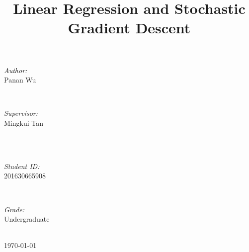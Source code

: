 \documentclass[journal, a4paper]{IEEEtran}
\begin{document}
\begin{titlepage}
\begin{minipage}{0.4\textwidth}
\begin{flushleft} \large
\emph{Author:}\\
Panan Wu %
\end{flushleft}
\end{minipage}
~
\begin{minipage}{0.4\textwidth}
\begin{flushright} \large
\emph{Supervisor:} \\
Mingkui Tan %
\end{flushright}
\end{minipage}\\[2cm]
~
\begin{minipage}{0.4\textwidth}
\begin{flushleft} \large
\emph{Student ID:}\\
201630665908
\end{flushleft}
\end{minipage}
~
\begin{minipage}{0.4\textwidth}
\begin{flushright} \large
\emph{Grade:} \\
Undergraduate
\end{flushright}
\end{minipage}\\[2cm]



{\large \today}\\[2cm] %

 

\vfill %

\end{titlepage}

	\title{Linear Regression and Stochastic Gradient Descent}
	\maketitle
\end{document}
